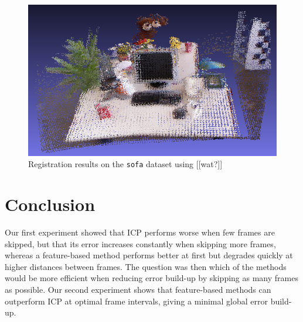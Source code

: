 \documentclass[a4paper]{article}
\begin{document}
\begin{figure}[htbp]
    \centering
        \includegraphics[width=\textwidth]{ims/sofa_results.png}
    \caption{Registration results on the \texttt{sofa} dataset using  [[wat?]]}
    \label{fig:sofa_results}
\end{figure}





\section{Conclusion}
Our first experiment showed that \ac{ICP} performs worse when few frames are skipped, but that its error increases constantly when skipping more frames, whereas a feature-based method performs better at first but degrades quickly at higher distances between frames. The question was then which of the methods would be more efficient when reducing error build-up by skipping as many frames as possible. Our second experiment shows that feature-based methods can outperform \ac{ICP} at optimal frame intervals, giving a minimal global error build-up.
\end{document}

